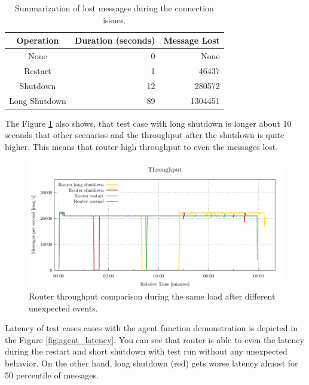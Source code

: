 \begin{table}[h]
\centering
\caption{Summarization of lost messages during the connection issues.}
\label{my-label}
\begin{tabular}{|c|r|r|}
\hline
\rowcolor[HTML]{C5E3DF}
Operation     & Duration (seconds) & Message Lost \\ \hline
None          & 0        & None         \\ \hline
Restart       & 1        & 46437        \\ \hline
Shutdown      & 12       & 280572       \\ \hline
Long Shutdown & 89       & 1304451      \\ \hline
\end{tabular}
\label{tab:agent_simple}
\end{table}

The Figure \ref{fig:agent_throughput} also shows, that test case with long shutdown is longer about 10 seconds that other scenarios and the throughput after the shutdown is quite higher. This means that router high throughput to even the messages lost.

\begin{figure}[h]
	\centering
	\includegraphics[width=1\linewidth]{obrazky-figures/charts-excel/agent.pdf}
	\caption{Router throughput comparison during the same load after different unexpected events.}
	\label{fig:agent_throughput}
\end{figure}

Latency of test cases cases with the agent function demonstration is depicted in the Figure \ref{fig:agent_latency}. You can see that router is able to even the latency during the restart and short shutdown with test run without any unexpected behavior. On the other hand, long shutdown (red) gets worse latency almost for 50 percentile of messages.


